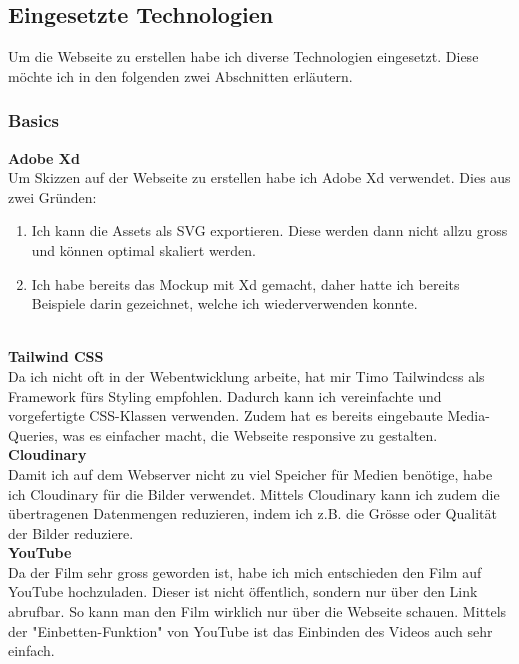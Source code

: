 \documentclass[11pt]{article}
\begin{document}
    \subsection{Eingesetzte Technologien}
    Um die Webseite zu erstellen habe ich diverse Technologien eingesetzt. Diese möchte ich in den folgenden zwei Abschnitten erläutern.

    \subsubsection{Basics}
    \textbf{Adobe Xd}\\
    Um Skizzen auf der Webseite zu erstellen habe ich Adobe Xd verwendet. Dies aus zwei Gründen:
    \begin{enumerate}
        \item Ich kann die Assets als SVG exportieren. Diese werden dann nicht allzu gross und können optimal skaliert werden.
        \item Ich habe bereits das Mockup mit Xd gemacht, daher hatte ich bereits Beispiele darin gezeichnet, welche ich wiederverwenden konnte.
    \end{enumerate}\\
    \textbf{Tailwind CSS}\\
    Da ich nicht oft in der Webentwicklung arbeite, hat mir Timo Tailwindcss als Framework fürs Styling empfohlen. Dadurch kann ich vereinfachte
    und vorgefertigte CSS-Klassen verwenden. Zudem hat es bereits eingebaute Media-Queries, was es einfacher macht, die Webseite responsive
    zu gestalten.\\
    \textbf{Cloudinary}\\
    Damit ich auf dem Webserver nicht zu viel Speicher für Medien benötige, habe ich Cloudinary für die Bilder verwendet. Mittels Cloudinary
    kann ich zudem die übertragenen Datenmengen reduzieren, indem ich z.B. die Grösse oder Qualität der Bilder reduziere.\\
    \textbf{YouTube}\\
    Da der Film sehr gross geworden ist, habe ich mich entschieden den Film auf YouTube hochzuladen. Dieser ist nicht öffentlich, sondern nur
    über den Link abrufbar. So kann man den Film wirklich nur über die Webseite schauen. Mittels der "Einbetten-Funktion" von YouTube ist
    das Einbinden des Videos auch sehr einfach.

\end{document}
